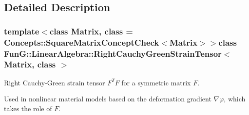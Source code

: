 \subsection{\-Detailed \-Description}
\subsubsection*{template$<$class Matrix, class = \-Concepts\-::\-Square\-Matrix\-Concept\-Check$<$\-Matrix$>$$>$class Fun\-G\-::\-Linear\-Algebra\-::\-Right\-Cauchy\-Green\-Strain\-Tensor$<$ Matrix, class $>$}

\-Right \-Cauchy-\/\-Green strain tensor $ F^T F $ for a symmetric matrix $ F $. 

\-Used in nonlinear material models based on the deformation gradient $\nabla\varphi$, which takes the role of $F$. 

